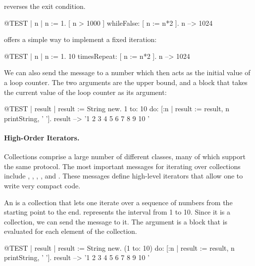 \documentclass[a4paper,10pt,twoside]{book}
\begin{document}
\noindent
{} reverses the exit condition.
\begin{code}{@TEST | n |}
n := 1.
[ n > 1000 ] whileFalse: [ n := n*2 ].
n --> 1024
\end{code}

\noindent
{} offers a simple way to implement a fixed iteration:

\begin{code}{@TEST | n |}
n := 1.
10 timesRepeat: [ n := n*2 ].
n --> 1024
\end{code}

We can also send the message  to a number which then acts as the initial value of a loop counter.
The two arguments are the upper bound, and a block that takes the current value of the loop counter as its argument:

\begin{code}{@TEST | result |}
result := String new.
1 to: 10 do: [:n | result := result, n printString, ' '].
result --> '1 2 3 4 5 6 7 8 9 10 '
\end{code}


\paragraph{High-Order Iterators.}
Collections comprise a large number of different classes, many of which support the same protocol.
The most important messages for iterating over collections include
, , , ,  and .
These messages define high-level iterators that allow one to write very compact code.

An  is a collection that lets one iterate over a sequence of numbers from the starting point to the end.
 represents the interval from 1 to 10.
Since it is a collection, we can send the message  to it.
The argument is a block that is evaluated for each element of the collection.

\begin{code}{@TEST | result |}
result := String new.
(1 to: 10) do: [:n | result := result, n printString, ' '].
result --> '1 2 3 4 5 6 7 8 9 10 '
\end{code}
\end{document}
